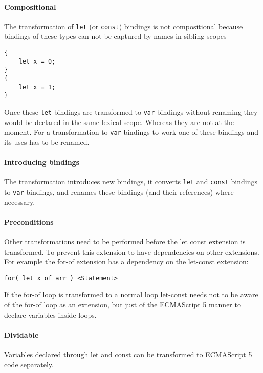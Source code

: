 \paragraph{Compositional}
The transformation of \lstinline$let$ (or \lstinline$const$) bindings is not compositional because bindings of these types can not be captured by names in sibling scopes

\begin{lstlisting}
{
	let x = 0;
}
{
	let x = 1;
}
\end{lstlisting}

Once these \lstinline$let$ bindings are transformed to \lstinline$var$ bindings without renaming they would be declared in the same lexical scope. Whereas they are not at the moment. For a transformation to \lstinline$var$ bindings to work one of these bindings and its uses has to be renamed.

\paragraph{Introducing bindings}
The transformation introduces new bindings, it converts \lstinline$let$ and \lstinline$const$ bindings to \lstinline$var$ bindings, and renames these bindings (and their references) where necessary.

\paragraph{Preconditions}
Other transformations need to be performed before the let const extension is transformed. To prevent this extension to have dependencies on other extensions. For example the for-of extension has a dependency on the let-const extension:

\begin{lstlisting}
for( let x of arr ) <Statement>
\end{lstlisting}

If the for-of loop is transformed to a normal loop let-const needs not to be aware of the for-of loop as an extension, but just of the ECMAScript 5 manner to declare variables inside loops.

\paragraph{Dividable}
Variables declared through let and const can be transformed to ECMAScript 5 code separately.
